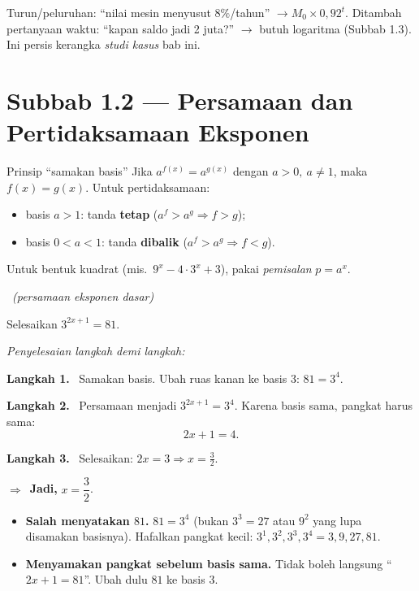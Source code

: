 \documentclass[11pt,a4paper]{report}
\theoremstyle{gaya}
\newcommand{\jawab}{\par\smallskip\noindent\textit{\textcolor{oranye}{Penyelesaian langkah demi langkah:}}\par\smallskip}
\newcommand{\langkah}[1]{\par\smallskip\noindent\textbf{\textcolor{biru}{Langkah #1.}}\ }
\newcommand{\jadi}{\par\smallskip\noindent$\Rightarrow$\ \textbf{Jadi, }}
\newcommand{\soalno}[2]{%
  \par\bigskip
  \noindent{\large\bfseries\color{ungu}\rule[-2pt]{4pt}{14pt}\ Soal #1}%
  \ {\normalfont\itshape\color{gray}(#2)}\par\nopagebreak\smallskip}
\begin{document}
\begin{variasi}
Turun/peluruhan: ``nilai mesin menyusut $8\%$/tahun'' $\to M_0\times 0{,}92^t$.
Ditambah pertanyaan waktu: ``kapan saldo jadi 2 juta?'' $\to$ butuh logaritma
(Subbab 1.3). Ini persis kerangka \emph{studi kasus} bab ini.
\end{variasi}

\section*{Subbab 1.2 — Persamaan dan Pertidaksamaan Eksponen}

\begin{ingat}{Prinsip ``samakan basis''}
Jika $a^{f(x)} = a^{g(x)}$ dengan $a>0,\ a\neq1$, maka $f(x)=g(x)$.
Untuk pertidaksamaan:
\begin{itemize}[leftmargin=*,topsep=1pt]
  \item basis $a>1$: tanda \textbf{tetap} ($a^{f}>a^{g}\Rightarrow f>g$);
  \item basis $0<a<1$: tanda \textbf{dibalik} ($a^{f}>a^{g}\Rightarrow f<g$).
\end{itemize}
Untuk bentuk kuadrat (mis.\ $9^x-4\cdot3^x+3$), pakai \emph{pemisalan} $p=a^x$.
\end{ingat}

\soalno{1.2.1}{persamaan eksponen dasar}
\begin{soalbox}{}
Selesaikan $3^{2x+1} = 81$.
\end{soalbox}

\jawab
\langkah{1} Samakan basis. Ubah ruas kanan ke basis $3$: $81 = 3^4$.
\langkah{2} Persamaan menjadi $3^{2x+1} = 3^{4}$. Karena basis sama, pangkat harus
sama:
\[
2x+1 = 4.
\]
\langkah{3} Selesaikan: $2x=3\Rightarrow x=\tfrac32$.
\jadi $x=\dfrac32$.

\begin{jebakan}
\begin{itemize}[leftmargin=*,topsep=2pt]
  \item \textbf{Salah menyatakan $81$.} $81=3^4$ (bukan $3^3=27$ atau $9^2$ yang
  lupa disamakan basisnya). Hafalkan pangkat kecil: $3^1,3^2,3^3,3^4=3,9,27,81$.
  \item \textbf{Menyamakan pangkat sebelum basis sama.} Tidak boleh langsung
  ``$2x+1=81$''. Ubah dulu $81$ ke basis $3$.
\end{itemize}
\end{jebakan}
\end{document}
